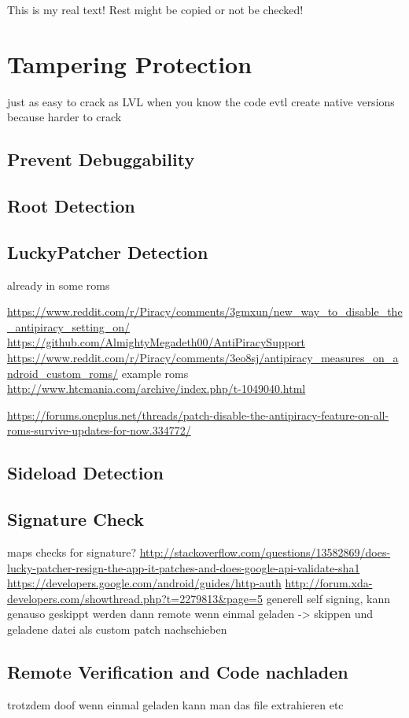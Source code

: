 This is my real text! Rest might be copied or not be checked!



\section{Tampering Protection} \label{section:evaluation-tampering}

just as easy to crack as LVL when you know the code\newline
evtl create native versions because harder to crack\newline

\subsection{Prevent Debuggability} \label{subsection:tampering-debuggable}
\subsection{Root Detection} \label{subsection:tampering-root}
\subsection{LuckyPatcher Detection} \label{subsection:tampering-luckypatcher}
already in some roms

 \url{https://www.reddit.com/r/Piracy/comments/3gmxun/new_way_to_disable_the_antipiracy_setting_on/}\newline
\url{https://github.com/AlmightyMegadeth00/AntiPiracySupport}\newline
\url{https://www.reddit.com/r/Piracy/comments/3eo8sj/antipiracy_measures_on_android_custom_roms/}\newline
example roms \url{http://www.htcmania.com/archive/index.php/t-1049040.html}\newline

\url{https://forums.oneplus.net/threads/patch-disable-the-antipiracy-feature-on-all-roms-survive-updates-for-now.334772/}
\subsection{Sideload Detection} \label{subsection:tampering-sideload}
\subsection{Signature Check} \label{subsection:tampering-signature}
maps checks for signature?\newline
\url{http://stackoverflow.com/questions/13582869/does-lucky-patcher-resign-the-app-it-patches-and-does-google-api-validate-sha1}\newline
\url{https://developers.google.com/android/guides/http-auth}
\url{http://forum.xda-developers.com/showthread.php?t=2279813&page=5}\newline
generell\newline
self signing, kann genauso geskippt werden dann
remote\newline
wenn einmal geladen -> skippen und geladene datei als custom patch nachschieben
\subsection{Remote Verification and Code nachladen} \label{subsection:external-remote}
trotzdem doof wenn einmal geladen kann man das file extrahieren etc
